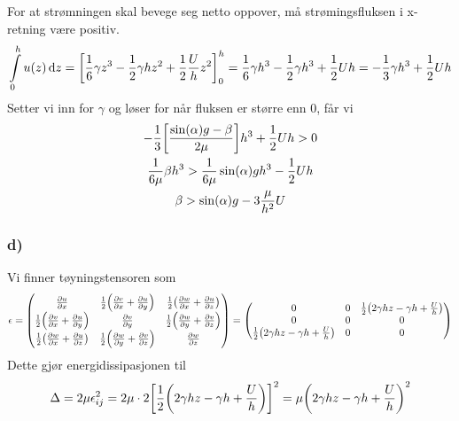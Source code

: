 \documentclass[12p,a4paper]{article}
\newcommand{\half}{\frac{1}{2}}
\begin{document}
For at strømningen skal bevege seg netto oppover, må strømingsfluksen i x-retning være positiv.
\begin{align*}
    \int\limits_0^h u(z) \dd{z} = \qty[\frac{1}{6}\gamma z^3 - \half\gamma h z^2 + \half\frac{U}{h}z^2 ]_0^h = \frac{1}{6}\gamma h^3 - \half\gamma h^3 + \half U h = -\frac{1}{3}\gamma h^3 + \half U h
\end{align*}
Setter vi inn for $\gamma$ og løser for når fluksen er større enn 0, får vi
\begin{gather*}
    -\frac{1}{3}\qty[\frac{\sin(\alpha)g - \beta}{2\mu}]h^3 + \half Uh > 0 \\
    \frac{1}{6\mu}\beta h^3 > \frac{1}{6\mu}\sin(\alpha)gh^3 - \half Uh \\
    \beta > \sin(\alpha)g - 3\frac{\mu}{h^2}U
\end{gather*}


\subsubsection*{d)}
Vi finner tøyningstensoren som
\begin{align*}
    \epsilon =
    \begin{pmatrix}
        \pdv{u}{x} & \half\qty(\pdv{v}{x} + \pdv{u}{y}) & \half\qty(\pdv{w}{x} + \pdv{u}{z}) \\
        \half\qty(\pdv{v}{x} + \pdv{u}{y}) & \pdv{v}{y} & \half\qty(\pdv{w}{y} + \pdv{v}{z}) \\
        \half\qty(\pdv{w}{x} + \pdv{u}{z}) & \half\qty(\pdv{w}{y} + \pdv{v}{z}) & \pdv{w}{z} \\
    \end{pmatrix}
    =
    \begin{pmatrix}
        0 & 0 & \half \qty(2\gamma hz - \gamma h + \frac{U}{h}) \\
        0 & 0 & 0 \\
        \half \qty(2\gamma hz - \gamma h + \frac{U}{h}) & 0 & 0
    \end{pmatrix}
\end{align*}
Dette gjør energidissipasjonen til
\begin{align*}
    \Delta = 2\mu\epsilon_{ij}^2 = 2\mu\cdot 2\qty[\half \qty(2\gamma hz - \gamma h + \frac{U}{h})]^2
    = \mu \qty(2\gamma hz - \gamma h + \frac{U}{h})^2
\end{align*}
\end{document}
